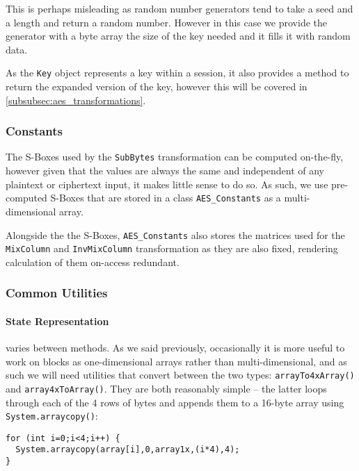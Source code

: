     This is perhaps misleading as random number generators tend to take a seed and a length and return a random number. However in this case we provide the generator with a byte array the size of the key needed and it fills it with random data.
    
    As the \verb!Key! object represents a key within a session, it also provides a method to return the expanded version of the key, however this will be covered in \textsection\ref{subsubsec:aes_transformations}.
    
    \subsubsection{Constants}
    
    The S-Boxes used by the \verb!SubBytes! transformation can be computed on-the-fly, however given that the values are always the same and independent of any plaintext or ciphertext input, it makes little sense to do so. As such, we use pre-computed S-Boxes that are stored in a class \verb!AES_Constants! as a multi-dimensional array.
    
    Alongside the the S-Boxes, \verb!AES_Constants! also stores the matrices used for the \verb!MixColumn! and \verb!InvMixColumn! transformation as they are also fixed, rendering calculation of them on-access redundant. 
    
    \subsubsection{Common Utilities}
    \label{subsubsec:aes_commonutils}
    
    \paragraph{State Representation} varies between methods. As we said previously, occasionally it is more useful to work on blocks as one-dimensional arrays rather than multi-dimensional, and as such we will need utilities that convert between the two types: \verb!arrayTo4xArray()! and \verb!array4xToArray()!. They are both reasonably simple -- the latter loops through each of the 4 rows of bytes and appends them to a 16-byte array using \verb!System.arraycopy()!: \\
    
    \begin{lstlisting}
for (int i=0;i<4;i++) {
  System.arraycopy(array[i],0,array1x,(i*4),4);
}
\end{lstlisting}

